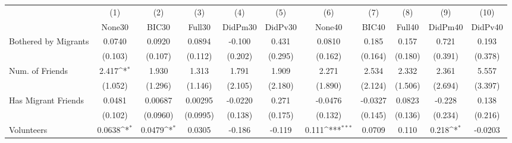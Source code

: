 {
\def\sym#1{\ifmmode^{#1}\else\(^{#1}\)\fi}
\begin{tabular}{l*{10}{c}}
\toprule
            &\multicolumn{1}{c}{(1)}&\multicolumn{1}{c}{(2)}&\multicolumn{1}{c}{(3)}&\multicolumn{1}{c}{(4)}&\multicolumn{1}{c}{(5)}&\multicolumn{1}{c}{(6)}&\multicolumn{1}{c}{(7)}&\multicolumn{1}{c}{(8)}&\multicolumn{1}{c}{(9)}&\multicolumn{1}{c}{(10)}\\
            &\multicolumn{1}{c}{None30}&\multicolumn{1}{c}{BIC30}&\multicolumn{1}{c}{Full30}&\multicolumn{1}{c}{DidPm30}&\multicolumn{1}{c}{DidPv30}&\multicolumn{1}{c}{None40}&\multicolumn{1}{c}{BIC40}&\multicolumn{1}{c}{Full40}&\multicolumn{1}{c}{DidPm40}&\multicolumn{1}{c}{DidPv40}\\
\midrule
Bothered by Migrants&      0.0740         &      0.0920         &      0.0894         &      -0.100         &       0.431         &      0.0810         &       0.185         &       0.157         &       0.721         &       0.193         \\
            &     (0.103)         &     (0.107)         &     (0.112)         &     (0.202)         &     (0.295)         &     (0.162)         &     (0.164)         &     (0.180)         &     (0.391)         &     (0.378)         \\
\addlinespace
Num. of Friends&       2.417\sym{*}  &       1.930         &       1.313         &       1.791         &       1.909         &       2.271         &       2.534         &       2.332         &       2.361         &       5.557         \\
            &     (1.052)         &     (1.296)         &     (1.146)         &     (2.105)         &     (2.180)         &     (1.890)         &     (2.124)         &     (1.506)         &     (2.694)         &     (3.397)         \\
\addlinespace
Has Migrant Friends&      0.0481         &     0.00687         &     0.00295         &     -0.0220         &       0.271         &     -0.0476         &     -0.0327         &      0.0823         &      -0.228         &       0.138         \\
            &     (0.102)         &    (0.0960)         &    (0.0995)         &     (0.138)         &     (0.175)         &     (0.132)         &     (0.145)         &     (0.136)         &     (0.234)         &     (0.216)         \\
\addlinespace
Volunteers  &      0.0638\sym{*}  &      0.0479\sym{*}  &      0.0305         &      -0.186         &      -0.119         &       0.111\sym{***}&      0.0709         &       0.110         &       0.218\sym{*}  &     -0.0203         \\

\end{tabular}}

